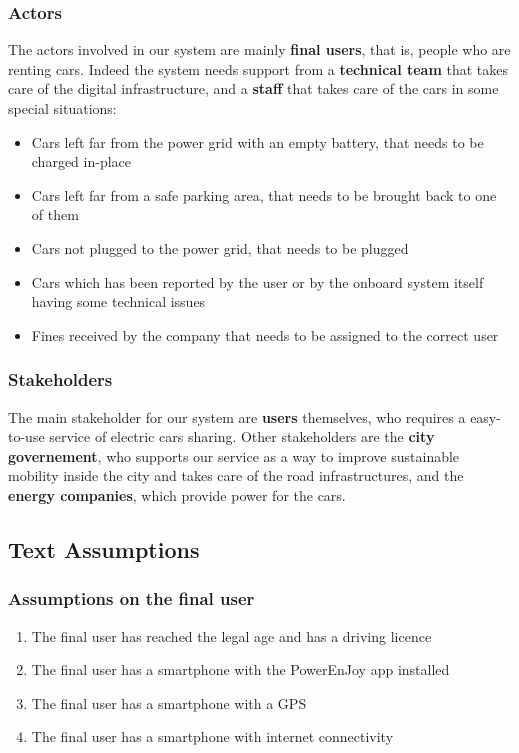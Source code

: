 \documentclass[11pt]{article} %
\newcommand{\pe}{PowerEnJoy }
\begin{document}
\subsubsection{Actors}
The actors involved in our system are mainly \textbf{final users}, that is, people who are renting cars. Indeed the system needs support from a \textbf{technical team} that takes care of the digital infrastructure, and a \textbf{staff} that takes care of the cars in some special situations:
\begin{itemize} 
	\item Cars left far from the power grid with an empty battery, that needs to be charged in-place
	\item Cars left far from a safe parking area, that needs to be brought back to one of them
	\item Cars not plugged to the power grid, that needs to be plugged
	\item Cars which has been reported by the user or by the onboard system itself having some technical issues
	\item Fines received by the company that needs to be assigned to the correct user
\end{itemize}

\subsubsection{Stakeholders}
The main stakeholder for our system are \textbf{users} themselves, who requires a easy-to-use service of electric cars sharing. Other stakeholders are the \textbf{city governement}, who supports our service as a way to improve sustainable mobility inside the city and takes care of the road infrastructures, and the \textbf{energy companies}, which provide power for the cars.

\subsection{Text Assumptions}

\subsubsection{Assumptions on the final user}
\begin{enumerate}
	\item The final user has reached the legal age and has a driving licence
	\item The final user has a smartphone with the \pe app installed
	\item The final user has a smartphone with a GPS
	\item The final user has a smartphone with internet connectivity
\end{enumerate}
  
\end{document}
